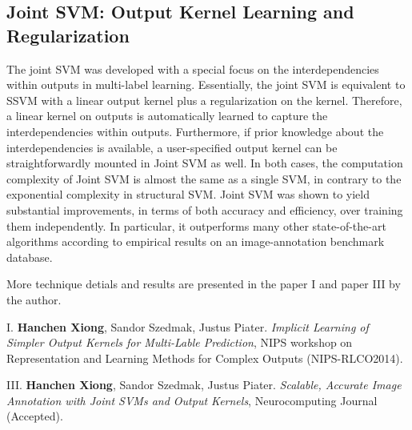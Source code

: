 \subsection{Joint SVM: Output Kernel Learning and Regularization }
The joint SVM was developed with a special focus on the interdependencies within outputs in multi-label learning.
Essentially, the joint SVM is equivalent to SSVM with a linear output kernel plus a regularization on the kernel.  
Therefore, a linear kernel on outputs is automatically learned to capture the interdependencies within outputs.  
Furthermore, if prior knowledge about the interdependencies is available, a user-specified output kernel can be 
straightforwardly mounted in Joint SVM as well.  
In both cases, the computation complexity of Joint SVM is almost the same as a single SVM, in contrary to the 
exponential complexity in structural SVM. 
Joint SVM was shown to yield substantial
improvements, in terms of both accuracy and efficiency, over
training them independently. In particular, it outperforms many
other state-of-the-art algorithms according to empirical results
on an image-annotation benchmark database. 

More technique detials and results are presented in the paper I and paper III by the author. 
\begin{shaded}
{\Huge I.} \textbf{Hanchen Xiong}, Sandor Szedmak, Justus Piater. {\it Implicit Learning of Simpler Output Kernels for Multi-Lable Prediction}, NIPS workshop on Representation and Learning Methods for Complex Outputs (NIPS-RLCO2014).  
\vspace{-.2cm}

{\Huge III.} \textbf{Hanchen Xiong}, Sandor Szedmak, Justus Piater. {\it Scalable, Accurate Image Annotation with Joint SVMs and Output Kernels}, Neurocomputing Journal (Accepted).  
\vspace{-.2cm}
\end{shaded}










